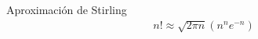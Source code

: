 {Aproximación de Stirling}
\begin{align}
 \label{1.33}
 n! \approx \sqrt{2\pi n}\left( n^{n}e^{-n} \right)
\end{align}


% 
% 
%
% 
%
% 
% 
%
